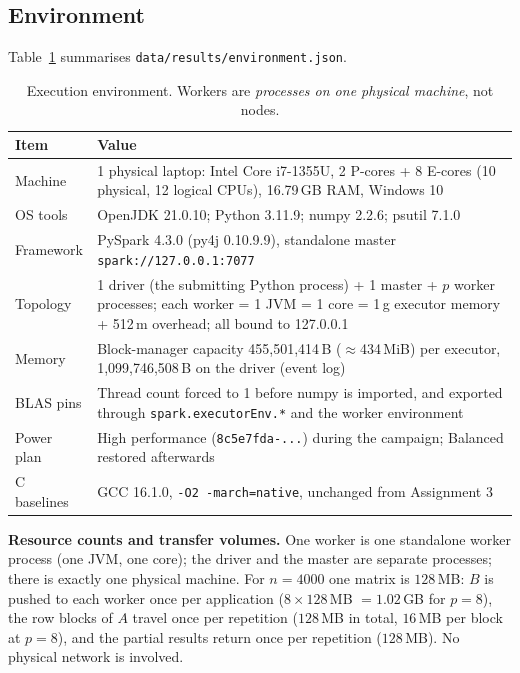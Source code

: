 \documentclass[11pt,a4paper]{article}
\begin{document}
\subsection{Environment}

Table~\ref{tab:env} summarises \texttt{data/results/environment.json}.

\begin{table}[h!]
\centering
\small
\setlength{\tabcolsep}{5pt}
\begin{tabular}{@{}lp{10.4cm}@{}}
\toprule
Item & Value \\
\midrule
Machine & 1 physical laptop: Intel Core i7-1355U, 2 P-cores + 8 E-cores
(10 physical, 12 logical CPUs), 16.79\,GB RAM, Windows 10 \\
OS tools & OpenJDK 21.0.10; Python 3.11.9; numpy 2.2.6; psutil 7.1.0 \\
Framework & PySpark 4.3.0 (py4j 0.10.9.9), standalone master
\texttt{spark://127.0.0.1:7077} \\
Topology & 1 driver (the submitting Python process) + 1 master + $p$
worker processes; each worker = 1 JVM = 1 core = 1\,g executor memory +
512\,m overhead; all bound to 127.0.0.1 \\
Memory & Block-manager capacity 455{,}501{,}414\,B ($\approx$434\,MiB)
per executor, 1{,}099{,}746{,}508\,B on the driver (event log) \\
BLAS pins & Thread count forced to 1 before numpy is imported, and
exported through \texttt{spark.executorEnv.*} and the worker environment \\
Power plan & High performance (\texttt{8c5e7fda-...}) during the campaign;
Balanced restored afterwards \\
C baselines & GCC 16.1.0, \texttt{-O2 -march=native}, unchanged from
Assignment 3 \\
\bottomrule
\end{tabular}
\caption{Execution environment. Workers are \emph{processes on one
physical machine}, not nodes.}
\label{tab:env}
\end{table}

\textbf{Resource counts and transfer volumes.}
One worker is one standalone worker process (one JVM, one core); the
driver and the master are separate processes; there is exactly one
physical machine. For $n=4000$ one matrix is $128$\,MB: $B$ is pushed to
each worker once per application ($8 \times 128$\,MB $= 1.02$\,GB for
$p=8$), the row blocks of $A$ travel once per repetition ($128$\,MB in
total, $16$\,MB per block at $p=8$), and the partial results return once
per repetition ($128$\,MB). No physical network is involved.
\end{document}
